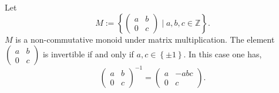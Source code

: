 \documentclass[11pt]{article}
\newenvironment{problem}[2][Problem\!]{\begin{trivlist}
\item[\hskip \labelsep {\bfseries #1}\hskip \labelsep {\bfseries #2}]}{\end{trivlist}}
\newcommand{\zz}{\mathbb Z}   %
\newcommand{\set}[1]{\left\{#1\right\}} %
\begin{document}
\begin{tcolorbox}
\begin{problem}{1.2}\newcommand{\pmat}{\begin{pmatrix}a & b \\ 0 & c\end{pmatrix}}
    \newcommand{\idm}{\begin{pmatrix}1 & 0 \\ 0 & 1 \end{pmatrix}}
    Let \[M :=\set{\pmat \mid a,b,c \in \zz}.\]
    $M$ is a non-commutative monoid under matrix multiplication. The element $\pmat$ is invertible if and only if $a,c\in \set{\pm 1}$. In this case one has, 
    \[\pmat^{-1} = \begin{pmatrix}a & -abc \\ 0 & c \end{pmatrix}.\]
\end{problem}
\end{tcolorbox}
\end{document}
